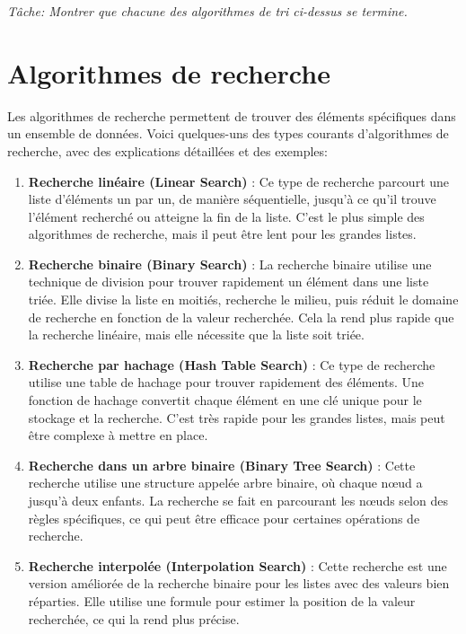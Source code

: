 \textit{T\^ache: Montrer que chacune des algorithmes de tri ci-dessus se termine.
}

\section{Algorithmes de recherche}

Les algorithmes de recherche permettent de trouver des éléments spécifiques dans un ensemble de données. Voici quelques-uns des types courants d'algorithmes de recherche, avec des explications détaillées et des exemples:

\begin{enumerate}
	\item \textbf{Recherche linéaire (Linear Search)} : Ce type de recherche parcourt une liste d'éléments un par un, de manière séquentielle, jusqu'à ce qu'il trouve l'élément recherché ou atteigne la fin de la liste. C'est le plus simple des algorithmes de recherche, mais il peut être lent pour les grandes listes.
	

	\item \textbf{Recherche binaire (Binary Search)} : La recherche binaire utilise une technique de division pour trouver rapidement un élément dans une liste triée. Elle divise la liste en moitiés, recherche le milieu, puis réduit le domaine de recherche en fonction de la valeur recherchée. Cela la rend plus rapide que la recherche linéaire, mais elle nécessite que la liste soit triée.
	
	
	
	\item \textbf{Recherche par hachage (Hash Table Search)} : Ce type de recherche utilise une table de hachage pour trouver rapidement des éléments. Une fonction de hachage convertit chaque élément en une clé unique pour le stockage et la recherche. C'est très rapide pour les grandes listes, mais peut être complexe à mettre en place.
	
	\item \textbf{Recherche dans un arbre binaire (Binary Tree Search)} : Cette recherche utilise une structure appelée arbre binaire, où chaque nœud a jusqu'à deux enfants. La recherche se fait en parcourant les nœuds selon des règles spécifiques, ce qui peut être efficace pour certaines opérations de recherche.
	
	\item \textbf{Recherche interpolée (Interpolation Search)} : Cette recherche est une version améliorée de la recherche binaire pour les listes avec des valeurs bien réparties. Elle utilise une formule pour estimer la position de la valeur recherchée, ce qui la rend plus précise.
	

\end{enumerate}
